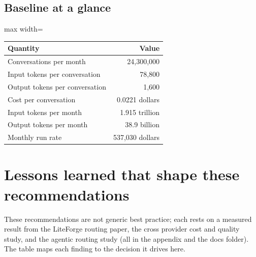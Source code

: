 \documentclass[11pt]{uce-report}
\begin{document}
\subsection{Baseline at a glance}
\vspace{0.4em}
\noindent\begin{adjustbox}{max width=\linewidth}\begin{tabular}{lr}
\toprule
\textbf{Quantity} & \textbf{Value} \\
\midrule
Conversations per month & 24,300,000 \\
Input tokens per conversation & 78,800 \\
Output tokens per conversation & 1,600 \\
Cost per conversation & 0.0221 dollars \\
Input tokens per month & 1.915 trillion \\
Output tokens per month & 38.9 billion \\
Monthly run rate & 537,030 dollars \\
\bottomrule
\end{tabular}\end{adjustbox}

\section{Lessons learned that shape these recommendations}
These recommendations are not generic best practice; each rests on a measured result from the LiteForge routing paper, the cross provider cost and quality study, and the agentic routing study (all in the appendix and the docs folder). The table maps each finding to the decision it drives here.
\end{document}
